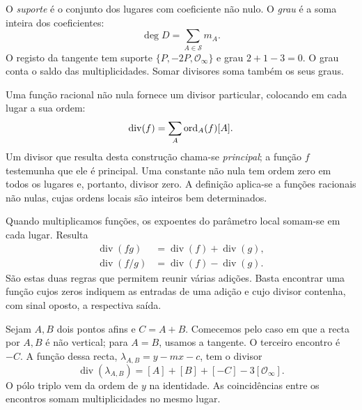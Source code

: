 O \emph{suporte} é o conjunto dos lugares com coeficiente não nulo.
O \emph{grau} é a soma inteira dos coeficientes:
\[
 \deg D=\sum_{A\in\mathcal S}m_A.
\]
O registo da tangente tem suporte \(\{P,-2P,\mathcal O_\infty\}\)
e grau \(2+1-3=0\). O grau conta o saldo das multiplicidades.
Somar divisores soma também os seus graus.

Uma função racional não nula fornece um divisor particular, colocando
em cada lugar a sua ordem:
\begin{equation}
 \operatorname{div}(f)=\sum_A\operatorname{ord}_A(f)[A].
 \label{eq:fcmp-rational-function-divisor}
\index{divisor@divisor!principal@principal}
\index{div f@\(\operatorname{div}(f)\), divisor de uma função}
\end{equation}
Um divisor que resulta desta construção chama-se \emph{principal};
a função \(f\) testemunha que ele é principal. Uma constante não nula
tem ordem zero em todos os lugares e, portanto, divisor zero. A definição
aplica-se a funções racionais não nulas, cujas ordens locais são inteiros
bem determinados.

Quando multiplicamos funções, os expoentes do parâmetro local somam-se
em cada lugar. Resulta
\begin{align*}
 \operatorname{div}(fg)&=\operatorname{div}(f)+\operatorname{div}(g),\\
 \operatorname{div}(f/g)&=\operatorname{div}(f)-\operatorname{div}(g).
\end{align*}
São estas duas regras que permitem reunir várias adições. Basta encontrar
uma função cujos zeros indiquem as entradas de uma adição e cujo divisor
contenha, com sinal oposto, a respectiva saída.

Sejam \(A,B\) dois pontos afins e \(C=A+B\). Comecemos pelo caso
em que a recta por \(A,B\) é não vertical; para \(A=B\), usamos
a tangente. O terceiro encontro é \(-C\). A função dessa recta,
\(\lambda_{A,B}=y-mx-c\), tem o divisor
\[
 \operatorname{div}(\lambda_{A,B})
 =[A]+[B]+[-C]-3[\mathcal O_\infty].
\]
O pólo triplo vem da ordem de \(y\) na identidade. As coincidências
entre os encontros somam multiplicidades no mesmo lugar.

